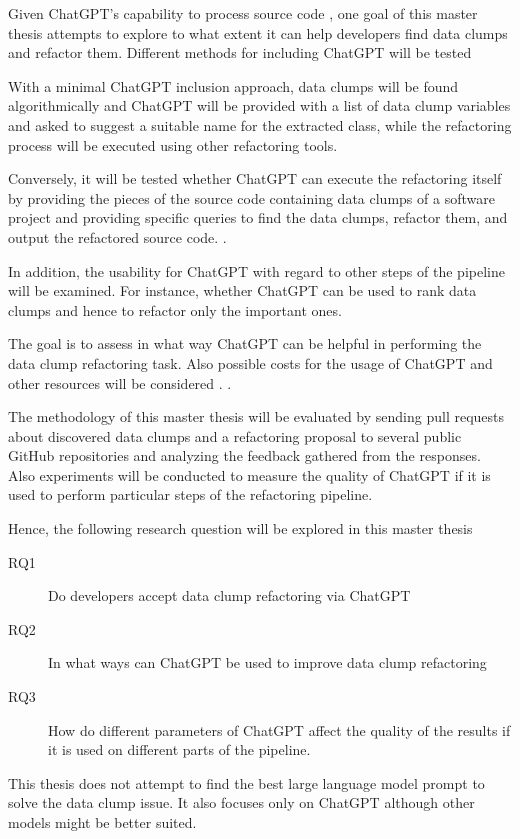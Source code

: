 Given ChatGPT's capability to process  source code \cite{sadik2023analysis}\cite{guo2023exploring}, one goal of this master thesis attempts to explore to what extent it can help developers find data clumps and refactor them. Different methods for including ChatGPT will be tested  

With a minimal ChatGPT inclusion approach,  data clumps will be found algorithmically  and ChatGPT will be provided with a list of data clump variables and asked to suggest a suitable name for the extracted class, while the refactoring process will be executed using other refactoring tools.


Conversely, it will be tested whether ChatGPT can execute the refactoring itself by providing the pieces of the source code containing data clumps of a software project and providing specific queries to find the data clumps, refactor them, and output the refactored source code. \cite{White2023ChatGPTPP}.

In addition, the usability for ChatGPT with regard to other steps of the pipeline will be examined. For instance, whether ChatGPT can be used to rank data clumps and hence to refactor only the important ones. 

The goal is to assess in what way ChatGPT can be helpful in performing the data clump refactoring task. Also possible costs for the usage of ChatGPT and other resources will be considered \cite{xia2023conversation}. \cite{4ef0b456377aafb68884e643779dffb36b8e7cc1}.


The methodology of this master thesis will be evaluated by sending  pull requests about discovered data clumps and a refactoring proposal to several public GitHub repositories and analyzing the feedback gathered from the responses. Also experiments will be conducted to measure the quality of ChatGPT if it is used to perform particular steps of the refactoring pipeline.  

Hence, the following research question will be explored in this master thesis

\begin{description}
    \item [RQ1] Do developers accept data clump refactoring via ChatGPT
    \item [RQ2] In what ways can ChatGPT be used to improve data clump refactoring
    \item [RQ3] How do different parameters of ChatGPT affect the quality of the results if it is used on different parts of the pipeline. 
\end{description}
This thesis does not attempt to find the best large language model prompt to solve the data clump issue. It also focuses only on ChatGPT although other models might be better suited. 
